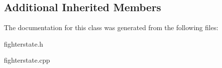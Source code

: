 \subsection*{Additional Inherited Members}


The documentation for this class was generated from the following files\+:\begin{DoxyCompactItemize}
\item 
fighterstate.\+h\item 
fighterstate.\+cpp\end{DoxyCompactItemize}
